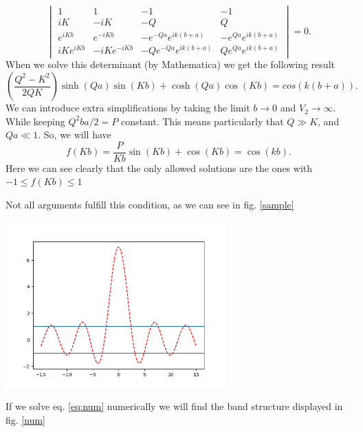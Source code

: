 \begin{questions}
\begin{solution}
\begin{equation}
    \begin{vmatrix}
      1&1&-1&-1\\
      iK&-iK&-Q&Q\\
      e^{iKb}&e^{-iKb}&-e^{-Qa}e^{ik(b+a)}&-e^{Qa}e^{ik(b+a)}\\
      iKe^{iKb}&-iKe^{-iKb}&-Qe^{-Qa}e^{ik(b+a)}&Qe^{Qa}e^{ik(b+a)}
    \end{vmatrix} = 0.
  \end{equation}
  When we solve this determinant (by Mathematica) we get the following result
  \begin{equation}
    \left(\frac{Q^2 - K^2}{2QK}\right)\sinh(Qa)\sin(Kb) + \cosh(Qa)\cos(Kb) = cos(k(b+a)).
    \label{eq:num}
  \end{equation}
  We can introduce extra simplifications by taking the limit $b\rightarrow0$ and $V_2\rightarrow \infty$. While keeping $Q^2ba/2 = P$ constant. This means particularly that $Q\gg K$, and $Qa\ll 1$. So, we will have
  \begin{equation}
    f(Kb) = \frac{P}{Kb}\sin(Kb) + \cos(Kb) = \cos(kb).
    \label{alm}
  \end{equation}
  Here we can see clearly that the only allowed solutions are the ones with $-1\leq f(Kb)\leq1$

 Not all arguments fulfill this condition, as we can see in fig. \ref{sample}

 \begin{center}
   \includegraphics[width=85mm]{sample}
 \end{center}

 \label{sample}\vspace{0.5cm}


If we solve eq. \ref{eq:num} numerically we will find the band structure displayed in fig. \ref{num}


\end{solution}
\end{questions}
